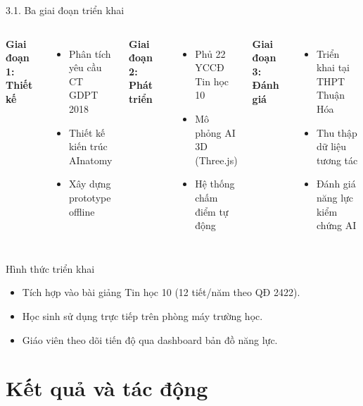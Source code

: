 \documentclass[10pt, aspectratio=169]{beamer}
\begin{document}
\begin{frame}{3.1. Ba giai đoạn triển khai}
    \begin{columns}
        \textbf{Giai đoạn 1: Thiết kế}
        \begin{itemize}
            \item Phân tích yêu cầu CT GDPT 2018
            \item Thiết kế kiến trúc AInatomy
            \item Xây dựng prototype offline
        \end{itemize}
        \textbf{Giai đoạn 2: Phát triển}
        \begin{itemize}
            \item Phủ 22 YCCĐ Tin học 10
            \item Mô phỏng AI 3D (Three.js)
            \item Hệ thống chấm điểm tự động
        \end{itemize}
        \textbf{Giai đoạn 3: Đánh giá}
        \begin{itemize}
            \item Triển khai tại THPT Thuận Hóa
            \item Thu thập dữ liệu tương tác
            \item Đánh giá năng lực kiểm chứng AI
        \end{itemize}
    \end{columns}
    
    \vspace{0.5em}
    
    \begin{block}{Hình thức triển khai}
        \begin{itemize}
            \item Tích hợp vào bài giảng Tin học 10 (12 tiết/năm theo QĐ 2422).
            \item Học sinh sử dụng trực tiếp trên phòng máy trường học.
            \item Giáo viên theo dõi tiến độ qua dashboard bản đồ năng lực.
        \end{itemize}
    \end{block}
\end{frame}

\section{Kết quả và tác động}
\end{document}
